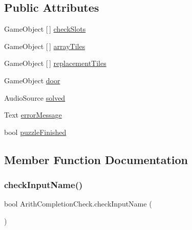 \subsection*{Public Attributes}
\begin{DoxyCompactItemize}
\item 
Game\+Object \mbox{[}$\,$\mbox{]} \hyperlink{class_arith_completion_check_a29d52d8c29770841ace7a35f5b47f8c7}{check\+Slots}
\item 
Game\+Object \mbox{[}$\,$\mbox{]} \hyperlink{class_arith_completion_check_a6dd56d93f27bc485fc9354f665a87c2e}{array\+Tiles}
\item 
Game\+Object \mbox{[}$\,$\mbox{]} \hyperlink{class_arith_completion_check_a3e4dcde9c1f9660ba26ed864b0a465ac}{replacement\+Tiles}
\item 
Game\+Object \hyperlink{class_arith_completion_check_a1ad4ba57922024cef5fc6e788a021f52}{door}
\item 
Audio\+Source \hyperlink{class_arith_completion_check_a3621baade2321e11481457c53e853595}{solved}
\item 
Text \hyperlink{class_arith_completion_check_a715d43af8f5e7b253e9f2da337733d4b}{error\+Message}
\item 
bool \hyperlink{class_arith_completion_check_a11562602e8ce1c9434e869aadf0ac697}{puzzle\+Finished}
\end{DoxyCompactItemize}


\subsection{Member Function Documentation}
\mbox{\label{class_arith_completion_check_ae813642087af9661c17a03f8545d6f34}} 
\subsubsection{\texorpdfstring{check\+Input\+Name()}{checkInputName()}}
{\footnotesize\ttfamily bool Arith\+Completion\+Check.\+check\+Input\+Name (\begin{DoxyParamCaption}{ }\end{DoxyParamCaption})}

\mbox{\label{class_arith_completion_check_a29984173a121cf0859ed1a08f4c0e5bd}} 
